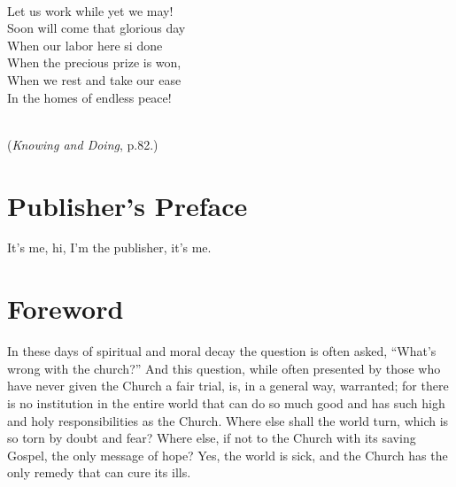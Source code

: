 \documentclass[
]{book}
\begin{document}
\strut \\
\hspace*{0.333em}\hspace*{0.333em}Let us work while yet we may!\\
\hspace*{0.333em}\hspace*{0.333em}Soon will come that glorious day\\
\hspace*{0.333em}\hspace*{0.333em}When our labor here si done\\
\hspace*{0.333em}\hspace*{0.333em}When the precious prize is won,\\
\hspace*{0.333em}\hspace*{0.333em}When we rest and take our ease\\
\hspace*{0.333em}\hspace*{0.333em}In the homes of endless peace!\\
\strut \\
\hspace*{0.333em}\hspace*{0.333em}(\emph{Knowing and Doing}, p.82.)

\hypertarget{publishers-preface}{%
\chapter*{Publisher's Preface}\label{publishers-preface}}

It's me, hi, I'm the publisher, it's me.

\hypertarget{foreword}{%
\chapter*{Foreword}\label{foreword}}

In these days of spiritual and moral decay the question is often asked, ``What's wrong with the church?'' And this question, while often presented by those who have never given the Church a fair trial, is, in a general way, warranted; for there is no institution in the entire world that can do so much good and has such high and holy responsibilities as the Church. Where else shall the world turn, which is so torn by doubt and fear? Where else, if not to the Church with its saving Gospel, the only message of hope? Yes, the world is sick, and the Church has the only remedy that can cure its ills.
\end{document}
